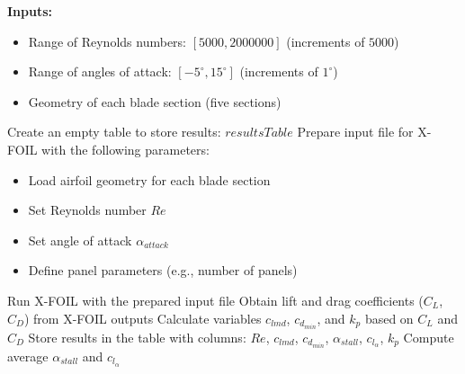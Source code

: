 \documentclass{Format}
\begin{document}
\begin{table}[h!]
    \centering
    \begin{minipage}{0.45\textwidth}
            \centering %
            \begin{algorithm}[H]
                \caption{Coefficient Calculation with X-FOIL}\label{alg:xfoil_coeff_calculation}
                \begin{algorithmic}[1]
                    \State \textbf{Inputs:} 
                    \begin{itemize}
                        \item Range of Reynolds numbers: $[5000, 2000000]$ (increments of $5000$)
                        \item Range of angles of attack: $[-5^\circ, 15^\circ]$ (increments of $1^\circ$)
                        \item Geometry of each blade section (five sections)
                    \end{itemize}
                    \State Create an empty table to store results: $resultsTable$
                            \State Prepare input file for X-FOIL with the following parameters:
                            \begin{itemize}
                                \item Load airfoil geometry for each blade section
                                \item Set Reynolds number $Re$
                                \item Set angle of attack $\alpha_{attack}$
                                \item Define panel parameters (e.g., number of panels)
                            \end{itemize}
                            \State Run X-FOIL with the prepared input file
                            \State Obtain lift and drag coefficients ($C_L$, $C_D$) from X-FOIL outputs
                        \EndFor
                        \State Calculate variables $c_{lmd}$, $c_{d_{min}}$, and $k_p$ based on $C_L$ and $C_D$
                        \State Store results in the table with columns: $Re$, $c_{lmd}$, $c_{d_{min}}$, $\alpha_{stall}$, $c_{l_{\alpha}}$, $k_p$
                        \State Compute average $\alpha_{stall}$ and $c_{l_{\alpha}}$

\end{algorithmic}
\end{algorithm}
\end{minipage}
\end{table}
\end{document}
